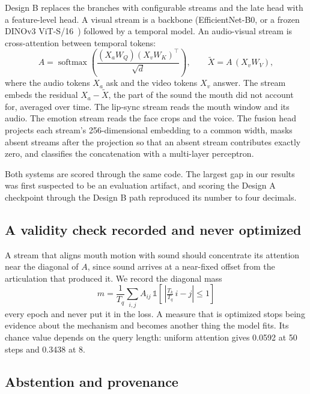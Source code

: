 \documentclass[conference]{IEEEtran}
\begin{document}
Design B replaces the branches with configurable streams and the late head
with a feature-level head. A visual stream is a backbone (EfficientNet-B0, or
a frozen DINOv3 ViT-S/16~\cite{dinov3}) followed by a temporal model. An
audio-visual stream is cross-attention between temporal tokens:
\begin{equation}
A = \operatorname{softmax}\!\left(\frac{(X_a W_Q)(X_v W_K)^\top}{\sqrt{d}}\right),
\qquad \tilde{X} = A\,(X_v W_V),
\end{equation}
where the audio tokens $X_a$ ask and the video tokens $X_v$ answer. The stream
embeds the residual $X_a - \tilde{X}$, the part of the sound the mouth did not
account for, averaged over time. The lip-sync stream reads the mouth window and
its audio. The emotion stream reads the face crops and the voice. The fusion
head projects each stream's 256-dimensional embedding to a common width, masks
absent streams after the projection so that an absent stream contributes
exactly zero, and classifies the concatenation with a multi-layer perceptron.

Both systems are scored through the same code. The largest gap in our results
was first suspected to be an evaluation artifact, and scoring the Design A
checkpoint through the Design B path reproduced its number to four decimals.

\subsection{A validity check recorded and never optimized}

A stream that aligns mouth motion with sound should concentrate its attention
near the diagonal of $A$, since sound arrives at a near-fixed offset from the
articulation that produced it. We record the diagonal mass
\begin{equation}
m = \frac{1}{T_q}\sum_{i,j} A_{ij}\,\mathbb{1}\!\left[\,\left|\tfrac{T_k}{T_q}\,i - j\right| \le 1\right]
\end{equation}
every epoch and never put it in the loss. A measure that is optimized stops
being evidence about the mechanism and becomes another thing the model fits.
Its chance value depends on the query length: uniform attention gives 0.0592
at 50 steps and 0.3438 at 8.

\subsection{Abstention and provenance}
\end{document}
